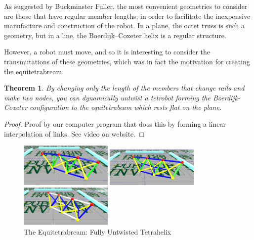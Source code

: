 \documentclass[11pt]{article}
\newtheorem{theorem}{Theorem}
\begin{document}
As suggested by Buckminster Fuller, the most convenient geometries to
consider are those that have regular member lengths, in order to
facilitate the inexpensive manufacture and construction of the robot.
In a plane, the octet truss is such a geometry, but in a line, the
Boerdijk--Coxeter helix is a regular structure.

However, a robot must move, and so it is interesting to consider the
transmutations of these geometries, which was in fact the motivation
for creating the equitetrabream.

\begin{theorem}
  By changing only the length of the members that change rails and make two nodes, you can dynamically untwist a tetrobot
  forming the Boerdijk-Coxeter configuration to the equitetrabeam which rests flat on the plane.
\end{theorem}

\begin{proof}
  Proof by our computer program that does this by forming a linear interpolation of links.
  See video on website\cite{readtetrahelix}.
\end{proof}

\begin{figure}[H] %
  \centering
     \includegraphics[width=0.4\textwidth]{figures/Tetrahelix1.png}
     \caption{2/3rd Twisted Tetrahelix}
     \includegraphics[width=0.4\textwidth]{figures/Tetrahelix2.png}
     \caption{1/3rd Twisted, 2/3rd Untwisted Tetrahelix}
     \includegraphics[width=0.4\textwidth]{figures/Tetrahelix3.png}
     \caption{The Equitetrabream: Fully Untwisted Tetrahelix}
\end{figure}
\end{document}
